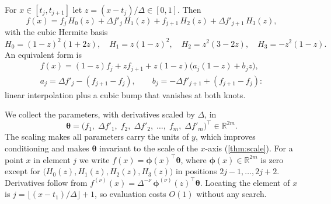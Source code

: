 \documentclass[11pt,a4paper]{article}
\theoremstyle{definition}
\theoremstyle{remark}
\newcommand{\R}{\mathbb{R}}
\newcommand{\vth}{\boldsymbol{\theta}}
\newcommand{\vphi}{\boldsymbol{\phi}}
\begin{document}
For $x\in[t_j,t_{j+1}]$ let $z=(x-t_j)/\Delta\in[0,1]$. Then
\begin{equation}
\label{eq:hermite}
f(x)=f_j\,H_0(z)+\Delta f'_j\,H_1(z)+f_{j+1}\,H_2(z)+\Delta f'_{j+1}\,H_3(z),
\end{equation}
with the cubic Hermite basis
\begin{equation}
H_0=(1-z)^2(1+2z),\quad H_1=z(1-z)^2,\quad H_2=z^2(3-2z),\quad H_3=-z^2(1-z).
\end{equation}
An equivalent form is
\begin{equation}
\label{eq:ab-form}
\begin{gathered}
f(x)=(1-z)f_j+z f_{j+1}+z(1-z)\bigl(a_j(1-z)+b_j z\bigr),\\
a_j=\Delta f'_j-(f_{j+1}-f_j),\qquad b_j=-\Delta f'_{j+1}+(f_{j+1}-f_j):
\end{gathered}
\end{equation}
linear interpolation plus a cubic bump that vanishes at both knots.

We collect the parameters, with derivatives scaled by $\Delta$, in
\begin{equation}
\vth=\bigl(f_1,\;\Delta f'_1,\;f_2,\;\Delta f'_2,\;\dots,\;f_m,\;\Delta f'_m\bigr)^\top\in\R^{2m}.
\end{equation}
The scaling makes all parameters carry the units of $y$, which improves conditioning and makes $\vth$ invariant to the scale of the $x$-axis (\cref{thm:scale}). For a point $x$ in element $j$ we write $f(x)=\vphi(x)^\top\vth$, where $\vphi(x)\in\R^{2m}$ is zero except for $\bigl(H_0(z),H_1(z),H_2(z),H_3(z)\bigr)$ in positions $2j-1,\dots,2j+2$. Derivatives follow from $f^{(\nu)}(x)=\Delta^{-\nu}\,\vphi^{(\nu)}(z)^\top\vth$. Locating the element of $x$ is $j=\lfloor (x-t_1)/\Delta\rfloor+1$, so evaluation costs $O(1)$ without any search.
\end{document}
